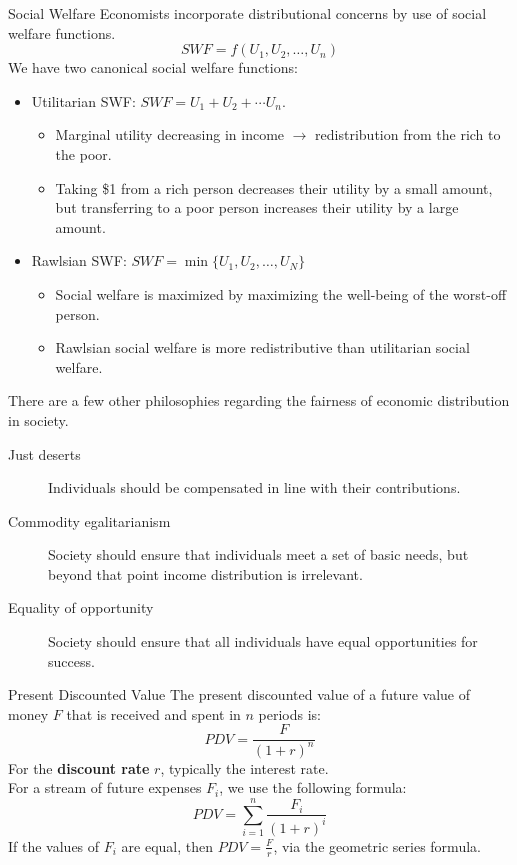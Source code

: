 \documentclass[10pt]{extarticle}
\begin{document}
  \begin{problem}{Social Welfare}
    Economists incorporate distributional concerns by use of social welfare functions.
    \[
      SWF = f(U_1,U_2,\dots,U_n)
    \] 
    We have two canonical social welfare functions:
    \begin{itemize}
      \item Utilitarian SWF: $SWF = U_1 + U_2 + \cdots U_n$.
      \begin{itemize}
        \item Marginal utility decreasing in income $\rightarrow$ redistribution from the rich to the poor.
        \item Taking \$1 from a rich person decreases their utility by a small amount, but transferring to a poor person increases their utility by a large amount.
      \end{itemize}
      \item Rawlsian SWF: $SWF = \min\{U_1,U_2,\dots,U_N\}$
      \begin{itemize}
        \item Social welfare is maximized by maximizing the well-being of the worst-off person.
        \item Rawlsian social welfare is more redistributive than utilitarian social welfare.
      \end{itemize}
    \end{itemize}
    There are a few other philosophies regarding the fairness of economic distribution in society.
    \begin{description}
      \item[Just deserts] Individuals should be compensated in line with their contributions.
      \item[Commodity egalitarianism] Society should ensure that individuals meet a set of basic needs, but beyond that point income distribution is irrelevant.
      \item[Equality of opportunity] Society should ensure that all individuals have equal opportunities for success.
    \end{description}
  \end{problem}
  \begin{problem}{Present Discounted Value}
    The present discounted value of a future value of money $F$ that is received and spent in $n$ periods is:
    \[
      PDV = \frac{F}{(1+r)^n}
    \] 
    For the \textbf{discount rate} $r$, typically the interest rate.\\

    For a stream of future expenses $F_i$, we use the following formula:
    \[
      PDV = \sum_{i = 1}^{n} \frac{F_i}{(1+r)^i}
    \] 
    If the values of $F_i$ are equal, then $PDV = \frac{F}{r}$, via the geometric series formula.
  \end{problem}
\end{document}
